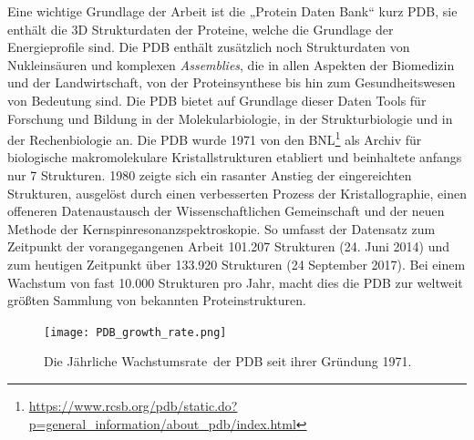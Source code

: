 Eine wichtige Grundlage der Arbeit ist die „Protein Daten Bank“ kurz PDB\cite{Bernstein.1977}, sie enthält die 3D Strukturdaten der Proteine, welche die Grundlage der Energieprofile sind. Die \ac{PDB} enthält zusätzlich noch Strukturdaten von Nukleinsäuren und komplexen \emph{Assemblies}, die in allen Aspekten der Biomedizin und der Landwirtschaft, von der Proteinsynthese bis hin zum Gesundheitswesen von Bedeutung sind. Die \ac{PDB} bietet auf Grundlage dieser Daten Tools für Forschung und Bildung in der Molekularbiologie, in der Strukturbiologie und in der Rechenbiologie an.
Die \ac{PDB} wurde 1971 von den \ac{BNL}\footnote{\url{https://www.rcsb.org/pdb/static.do?p=general_information/about_pdb/index.html}} als Archiv für biologische makromolekulare Kristallstrukturen etabliert und beinhaltete anfangs nur 7 Strukturen. 1980 zeigte sich ein rasanter Anstieg der eingereichten Strukturen, ausgelöst durch einen verbesserten Prozess der Kristallographie, einen offeneren Datenaustausch der Wissenschaftlichen Gemeinschaft und der neuen Methode der Kernspinresonanzspektroskopie. So umfasst der Datensatz zum Zeitpunkt der vorangegangenen Arbeit 101.207 Strukturen (24. Juni 2014) und zum heutigen Zeitpunkt über 133.920 Strukturen (24 September 2017). Bei einem Wachstum von fast 10.000 Strukturen pro Jahr, macht dies die \ac{PDB} zur weltweit größten Sammlung von bekannten Proteinstrukturen.

\begin{figure}
\texttt{[image: PDB\_growth\_rate.png]}
\caption[Caption for LOF]{Die Jährliche Wachstumsrate\protect\footnotemark \ der \ac{PDB} seit ihrer Gründung 1971.}
\label{fig:PDB_growth_rate}
\end{figure}


